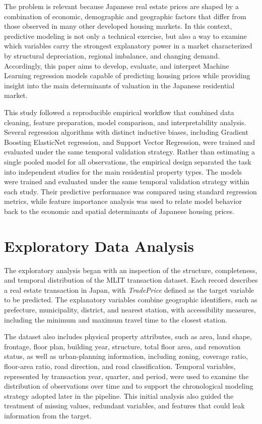 \documentclass[12pt]{article}
\begin{document}
The problem is relevant because Japanese real estate prices are shaped by a combination of economic, demographic and
geographic factors that differ from those observed in many other developed housing markets. In this context, predictive
modeling is not only a technical exercise, but also a way to examine which variables carry the strongest explanatory
power in a market characterized by structural depreciation, regional imbalance, and changing demand. Accordingly, this
paper aims to develop, evaluate, and interpret Machine Learning regression models capable of predicting housing prices
while providing insight into the main determinants of valuation in the Japanese residential market.

This study followed a reproducible empirical workflow that combined data cleaning, feature preparation, model
comparison, and interpretability analysis. Several regression algorithms with distinct inductive biases, including
Gradient Boosting ElasticNet regression, and Support Vector Regression, were trained and evaluated under the same
temporal validation strategy. Rather than estimating a single pooled model for all observations, the empirical design
separated the task into independent studies for the main residential property types. The models were trained and
evaluated under the same temporal validation strategy within each study. Their predictive performance was compared using
standard regression metrics, while feature importance analysis was used to relate model behavior back to the economic
and spatial determinants of Japanese housing prices.

\section{Exploratory Data Analysis}
The exploratory analysis began with an inspection of the structure, completeness, and temporal distribution of the MLIT
transaction dataset. Each record describes a real estate transaction in Japan, with \textit{TradePrice} defined as the
target variable to be predicted. The explanatory variables combine geographic identifiers, such as prefecture,
municipality, district, and nearest station, with accessibility measures, including the minimum and maximum travel time
to the closest station.

The dataset also includes physical property attributes, such as area, land shape, frontage, floor plan, building year,
structure, total floor area, and renovation status, as well as urban-planning information, including zoning, coverage
ratio, floor-area ratio, road direction, and road classification. Temporal variables, represented by transaction year,
quarter, and period, were used to examine the distribution of observations over time and to support the chronological
modeling strategy adopted later in the pipeline. This initial analysis also guided the treatment of missing values,
redundant variables, and features that could leak information from the target.
\end{document}
